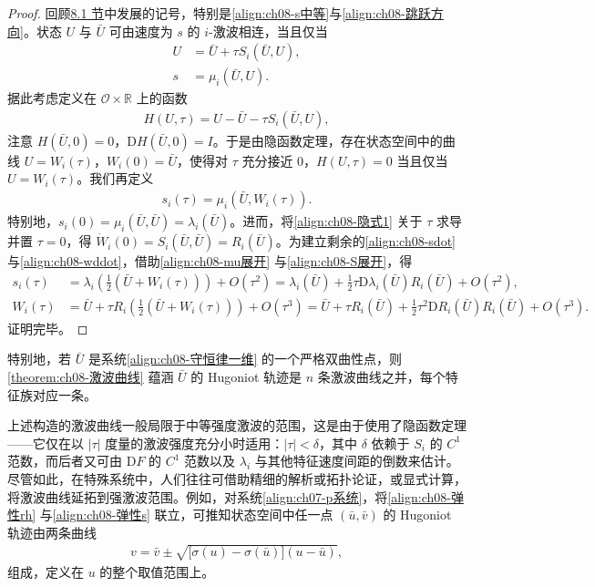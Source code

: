 \documentclass[../../main.tex]{subfiles}
\begin{document}
\begin{proof}
回顾\hyperref[section:ch08-强激波弱激波中等强度激波]{8.1 节}中发展的记号，特别是\eqref{align:ch08-s中等}与\eqref{align:ch08-跳跃方向}。状态 $U$ 与 $\bar U$ 可由速度为 $s$ 的 $i$-激波相连，当且仅当
\begin{align}
U&=\bar U+\tau S_i(\bar U,U),
\label{align:ch08-隐式1}\\
s&=\mu_i(\bar U,U).
\label{align:ch08-隐式2}
\end{align}
据此考虑定义在 $\mathcal O\times\mathbb R$ 上的函数
\begin{align}
H(U,\tau)=U-\bar U-\tau S_i(\bar U,U),
\label{align:ch08-H}
\end{align}
注意 $H(\bar U,0)=0$，$\mathrm{D}H(\bar U,0)=I$。于是由隐函数定理，存在状态空间中的曲线 $U=W_i(\tau)$，$W_i(0)=\bar U$，使得对 $\tau$ 充分接近 $0$，$H(U,\tau)=0$ 当且仅当 $U=W_i(\tau)$。我们再定义
\begin{align}
s_i(\tau)=\mu_i(\bar U,W_i(\tau)).
\label{align:ch08-si定义}
\end{align}
特别地，$s_i(0)=\mu_i(\bar U,\bar U)=\lambda_i(\bar U)$。进而，将\eqref{align:ch08-隐式1} 关于 $\tau$ 求导并置 $\tau=0$，得 $\dot W_i(0)=S_i(\bar U,\bar U)=R_i(\bar U)$。为建立剩余的\eqref{align:ch08-sdot} 与\eqref{align:ch08-wddot}，借助\eqref{align:ch08-mu展开} 与\eqref{align:ch08-S展开}，得
\begin{align}
s_i(\tau)&=\lambda_i\!\left(\tfrac12(\bar U+W_i(\tau))\right)+O(\tau^2)
=\lambda_i(\bar U)+\tfrac12\tau\mathrm{D}\lambda_i(\bar U)R_i(\bar U)+O(\tau^2),
\label{align:ch08-si展开}\\
W_i(\tau)&=\bar U+\tau R_i\!\left(\tfrac12(\bar U+W_i(\tau))\right)+O(\tau^3)
=\bar U+\tau R_i(\bar U)+\tfrac12\tau^2\mathrm{D}R_i(\bar U)R_i(\bar U)+O(\tau^3).
\label{align:ch08-wi展开}
\end{align}
证明完毕。
\end{proof}

特别地，若 $\bar U$ 是系统\eqref{align:ch08-守恒律一维} 的一个严格双曲性点，则\cref{theorem:ch08-激波曲线} 蕴涵 $\bar U$ 的 Hugoniot 轨迹是 $n$ 条激波曲线之并，每个特征族对应一条。

上述构造的激波曲线一般局限于中等强度激波的范围，这是由于使用了隐函数定理——它仅在以 $|\tau|$ 度量的激波强度充分小时适用：$|\tau|<\delta$，其中 $\delta$ 依赖于 $S_i$ 的 $C^1$ 范数，而后者又可由 $\mathrm{D}F$ 的 $C^1$ 范数以及 $\lambda_i$ 与其他特征速度间距的倒数来估计。尽管如此，在特殊系统中，人们往往可借助精细的解析或拓扑论证，或显式计算，将激波曲线延拓到强激波范围。例如，对系统\eqref{align:ch07-p系统}，将\eqref{align:ch08-弹性rh} 与\eqref{align:ch08-弹性s} 联立，可推知状态空间中任一点 $(\bar u,\bar v)$ 的 Hugoniot 轨迹由两条曲线
\begin{align}
v=\bar v\pm\sqrt{\big[\sigma(u)-\sigma(\bar u)\big](u-\bar u)},
\label{align:ch08-弹性轨迹}
\end{align}
组成，定义在 $u$ 的整个取值范围上。
\end{document}
